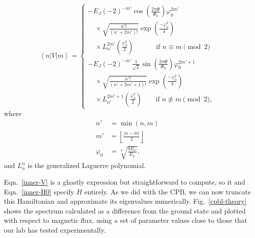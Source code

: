 \documentclass[twocolumn]{revtex4}
\newcommand{\innerp}[3]{\textstyle\left< #1 \left| #2 \right| #3 \right>}
\begin{document}
\begin{equation}
  \innerp{n}{V}{m} = \left\{\begin{array}{l}
      -E_J(-2)^{-m'}\cos\left(\frac{2\pi\Phi}{\Phi_0}\right)\varphi_0^{2m'}\\
      \quad{}\times \sqrt{\frac{n'!}{(n'+2m')!}}
      \exp\left(\frac{-\varphi_0^2}{4}\right)\\
      \quad{}\times L_{n'}^{2m'}\left(\frac{\varphi_0^2}{2}\right)
      \phantom{{}^{{}+1}}\qquad \text{if $n \equiv m \pmod{2}$}\\
      -E_J(-2)^{-m'}\frac{1}{\sqrt{2}}\sin
      \left(\frac{2\pi\Phi}{\Phi_0}\right)\varphi_0^{2m'+1}\\
      \quad{}\times \sqrt{\frac{n'!}{(n'+2m'+1)!}}
      \exp\left(\frac{-\varphi_0^2}{4}\right)\\
      \quad{}\times L_{n'}^{2m'+1}\left(\frac{\varphi_0^2}{2}\right)
      \qquad\text{if $n \not\equiv m \pmod{2}$},
\end{array}\right.
\label{inner-V}
\end{equation}
where
\begin{align}
  n'& =\min(n,m)\\
  m'&=\left\lfloor\frac{|n-m|}{2}\right\rfloor \\
  \varphi_0 &=\sqrt[4]{\frac{8E_C}{E_L}},
\end{align}
and $L_n^\alpha$ is the generalized Laguerre polynomial.

Eqn.~\eqref{inner-V} is a ghastly expression but straightforward to
compute, so it and Eqn.~\eqref{inner-H0} specify $H$ entirely. As we
did with the CPB, we can now truncate this Hamiltonian and approximate
its eigenvalues numerically. Fig.~\ref{cpbl-theory} shows the spectrum
calculated as a difference from the ground state and plotted with
respect to magnetic flux, using a set of parameter values close to
those that our lab has tested experimentally.
\end{document}
